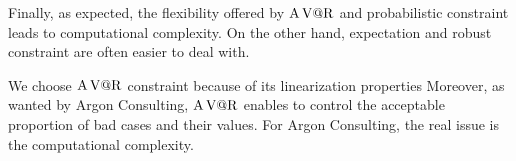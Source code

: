 Finally, as expected, the flexibility offered by $\operatorname{A\operatorname{V@R}}$ and probabilistic constraint leads to computational complexity.
On the other hand, expectation and robust constraint are often easier to deal with.


\medskip


We choose $\operatorname{A\operatorname{V@R}}$ constraint because of its linearization properties
Moreover, as wanted by Argon Consulting, $\operatorname{A\operatorname{V@R}}$ enables to control the acceptable proportion of bad cases and their values.
For Argon Consulting, the real issue is the computational complexity.

